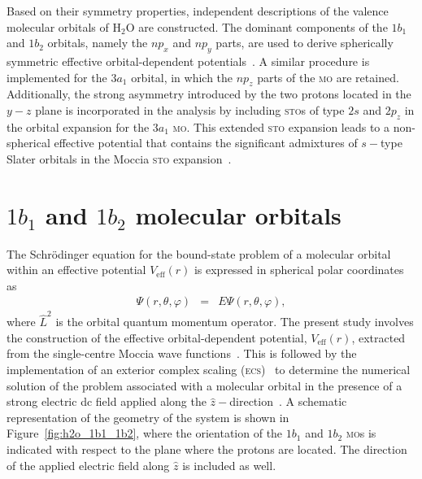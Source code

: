 Based on their symmetry properties, independent descriptions of the
valence molecular orbitals of H$_{2}$O are constructed. The dominant
components of the $1b_{1}$ and $1b_{2}$ orbitals, namely the $np_{x}$
and $np_{y}$ parts, are used to derive spherically symmetric effective
orbital-dependent potentials~\cite{sarias_2016}. A similar procedure
is implemented for the $3a_{1}$ orbital, in which the $np_{z}$ parts
of the \textsc{mo} are retained. Additionally, the strong asymmetry
introduced by the two protons located in the $y-z$ plane is
incorporated in the analysis by including \textsc{sto}s of type $2s$
and $2p_{z}$ in the orbital expansion for the $3a_{1}$
\textsc{mo}. This extended \textsc{sto} expansion leads to a
non-spherical effective potential that contains the significant
admixtures of $s-$type Slater orbitals in the Moccia \textsc{sto}
expansion~\cite{Moccia_1964}.
 



\section{$1b_{1}$ and $1b_{2}$ molecular orbitals}
\label{ch:1b1_1b2}

The Schr\"{o}dinger equation for the bound-state problem of a
molecular orbital within an effective potential $V_{\mathrm{eff}}(r)$
is expressed in spherical polar coordinates as
%
\begin{eqnarray}
  [ -\frac{1}{2} (\frac{\partial^{2}}{\partial r^{2}} +
    \frac{2}{r} \frac{\partial}{\partial r}) +
    \frac{\hat{L}^2}{2r^2} + V_{\rm{eff}}(r) ] \Psi(r,\theta,\varphi)
  & = & E\Psi(r,\theta,\varphi),
\label{eq:sch_noCS}
\end{eqnarray}
%
where $\hat{L}^{2}$ is the orbital quantum momentum operator. The
present study involves the construction of the effective
orbital-dependent potential, $V_{\mathrm{eff}}(r)$, extracted from the
single-centre Moccia wave functions~\cite{Moccia_1964}. This is
followed by the implementation of an exterior complex scaling
(\textsc{ecs})~\cite{Simon_1979} to determine the numerical solution
of the problem associated with a molecular orbital in the presence of
a strong electric dc field applied along the
$\hat{z}-$direction~\cite{sarias_2016}. A schematic representation of
the geometry of the system is shown in Figure~\ref{fig:h2o_1b1_1b2},
where the orientation of the $1b_{1}$ and $1b_{2}$ \textsc{mo}s is
indicated with respect to the plane where the protons are located. The
direction of the applied electric field along $\hat{z}$ is included as
well.

